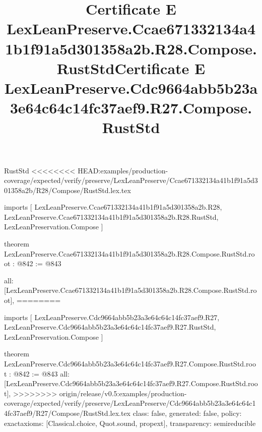 \begin{lexlean}{RustStd}
<<<<<<<< HEAD:examples/production-coverage/expected/verify/preserve/LexLeanPreserve/Ccae671332134a41b1f91a5d301358a2b/R28/Compose/RustStd.lex.tex
\title{Certificate E LexLeanPreserve.Ccae671332134a41b1f91a5d301358a2b.R28.Compose.RustStd}
\begin{coremodule}
imports [
  LexLeanPreserve.Ccae671332134a41b1f91a5d301358a2b.R28,
  LexLeanPreserve.Ccae671332134a41b1f91a5d301358a2b.R28.RustStd,
  LexLeanPreservation.Compose
]

theorem LexLeanPreserve.Ccae671332134a41b1f91a5d301358a2b.R28.Compose.RustStd.root : @842 := @843 {
  all: [LexLeanPreserve.Ccae671332134a41b1f91a5d301358a2b.R28.Compose.RustStd.root],
========
\title{Certificate E LexLeanPreserve.Cdc9664abb5b23a3e64c64c14fc37aef9.R27.Compose.RustStd}
\begin{coremodule}
imports [
  LexLeanPreserve.Cdc9664abb5b23a3e64c64c14fc37aef9.R27,
  LexLeanPreserve.Cdc9664abb5b23a3e64c64c14fc37aef9.R27.RustStd,
  LexLeanPreservation.Compose
]

theorem LexLeanPreserve.Cdc9664abb5b23a3e64c64c14fc37aef9.R27.Compose.RustStd.root : @842 := @843 {
  all: [LexLeanPreserve.Cdc9664abb5b23a3e64c64c14fc37aef9.R27.Compose.RustStd.root],
>>>>>>>> origin/release/v0.5:examples/production-coverage/expected/verify/preserve/LexLeanPreserve/Cdc9664abb5b23a3e64c64c14fc37aef9/R27/Compose/RustStd.lex.tex
  class: false,
  generated: false,
  policy: exact{axioms: [Classical.choice, Quot.sound, propext]},
  transparency: semireducible
}


\end{coremodule}}
\end{coremodule}
\end{lexlean}
